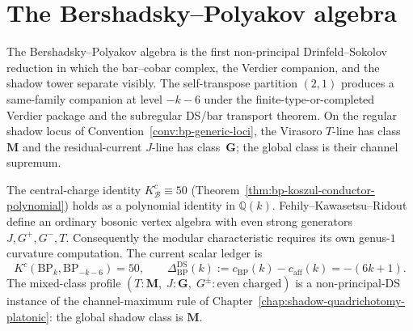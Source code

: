\chapter{The Bershadsky--Polyakov algebra}\label{chap:bershadsky-polyakov}\label{ch:bershadsky-polyakov}

The Bershadsky--Polyakov algebra is the first non-principal
Drinfeld--Sokolov reduction in which the bar--cobar complex, the
Verdier companion, and the shadow tower separate visibly.  The
self-transpose partition $(2,1)$ produces a same-family companion at
level $-k-6$ under the finite-type-or-completed Verdier package and the
subregular DS/bar transport theorem.  On the regular shadow locus of
Convention~\ref{conv:bp-generic-loci}, the Virasoro $T$-line has
class~$\mathbf{M}$ and the residual-current $J$-line has
class~$\mathbf{G}$; the global class is their channel supremum.

The central-charge identity $K^c_{\mathcal{B}} \equiv 50$
(Theorem~\ref{thm:bp-koszul-conductor-polynomial}) holds as a
polynomial identity in $\mathbb{Q}(k)$.  Fehily--Kawasetsu--Ridout
\cite[Definition~2.1 and Eq.~\textup{(}2.2\textup{)}]{FKR20} define an
ordinary bosonic vertex algebra with even strong generators
$J,G^+,G^-,T$.  Consequently the modular characteristic requires its
own genus-$1$ curvature computation.  The current scalar ledger is
\[
K^c(\mathrm{BP}_k,\mathrm{BP}_{-k-6})=50,\qquad
\Delta^{\mathrm{DS}}_{\mathrm{BP}}(k)
:=c_{\mathrm{BP}}(k)-c_{\mathrm{aff}}(k)=-(6k+1).
\]
The mixed-class profile
$(T\colon\mathbf{M},\;J\colon\mathbf{G},\;G^{\pm}\colon\text{even charged})$
is a non-principal-DS instance of the channel-maximum rule of
Chapter~\ref{chap:shadow-quadrichotomy-platonic}: the global
shadow class is $\mathbf{M}$.

